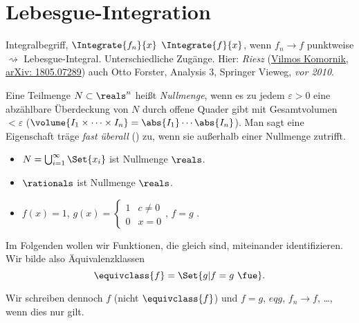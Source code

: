 \chapter{Lebesgue-Integration}
Integralbegriff, \sd \( \Integrate{f_n}{x} \) \tto \( \Integrate{f}{x} \), wenn \( f_n\to f \) punktweise \( \rightsquigarrow \) Lebesgue-Integral. Unterschiedliche Zugänge. Hier: \emph{Riesz} (\href{https://arxiv.org/abs/1805.07289}{Vilmos Komornik, arXiv: 1805.07289}) \vgl auch Otto Forster, Analysis 3, Springer Vieweg, \emph{vor 2010}.

\begin{definition}\label{nullmenge}
  Eine Teilmenge \( N\subset \reals^n \) heißt \emph{Nullmenge}, wenn es zu jedem \( \varepsilon>0 \) eine abzählbare Überdeckung von \( N \) durch offene Quader gibt mit Gesamtvolumen \( <\varepsilon \) (\( \volume{I_1\times \dotsb \times I_n}=\abs{I_1}\dotsm \abs{I_n} \)). Man sagt eine Eigenschaft träge \emph{fast überall} (\fue) zu, wenn sie außerhalb einer Nullmenge zutrifft.
\end{definition}
\begin{beispiele*}
  \begin{itemize}
    \item \( N=\bigcup_{i=1}^{\infty}\Set{x_i} \) ist Nullmenge \tsubset \( \reals \).
    \item \( \rationals \) ist Nullmenge \tsubset \( \reals \).
    \item \( f(x)=1 \), \( g(x)=\begin{cases}
      1 & c\neq 0 \\ 0 & x=0
    \end{cases} \), \( f=g \) \fue.
  \end{itemize}
\end{beispiele*}
Im Folgenden wollen wir Funktionen, die \fue gleich sind, miteinander identifizieren. Wir bilde also Äquivalenzklassen
\begin{equation*}
  \equivclass{f}=\Set{g|f=g \text{ \fue}}.
\end{equation*}
\begin{notation*}
  Wir schreiben dennoch \( f \) (nicht \( \equivclass{f} \)) und \( f=g \), \tsubset \(eq g \), \( f_n\to f \), \dots, wenn dies nur \fue gilt.
\end{notation*}
